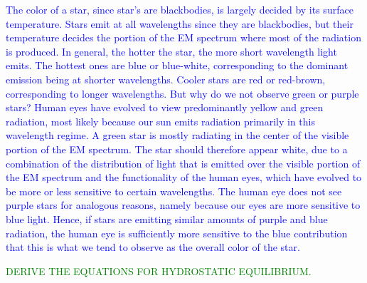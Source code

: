 \documentclass[main.tex]{subfiles}
\begin{document}
\begin{tcolorbox}[sharp corners, colback=blue!30, colframe=blue!80!blue, title=Why is a star observed to have a given color?$^{12}$]
\par \textcolor{blue} {%
The color of a star, since star's are blackbodies, is largely decided by its surface temperature. Stars emit at all wavelengths since they are blackbodies, but their temperature decides the portion of the EM spectrum where most of the radiation is produced.  In general, the hotter the star, the more short wavelength light emits. The hottest ones are blue or blue-white, corresponding to the dominant emission being at shorter wavelengths. Cooler stars are red or red-brown, corresponding to longer wavelengths. 
But why do we not observe green or purple stars?  Human eyes have evolved to view predominantly yellow and green radiation, most likely because our sun emits radiation primarily in this wavelength regime.  A green star is mostly radiating in the center of the visible portion of the EM spectrum. The star should therefore appear white, due to a combination of the distribution of light that is emitted over the visible portion of the EM spectrum and the functionality of the human eyes, which have evolved to be more or less sensitive to certain wavelengths.  The human eye does not see purple stars for analogous reasons, namely because our eyes are more sensitive to blue light.  Hence, if stars are emitting similar amounts of purple and blue radiation, the human eye is sufficiently more sensitive to the blue contribution that this is what we tend to observe as the overall color of the star.}
\end{tcolorbox}

\begin{tcolorbox}[sharp corners, colback=green!30, colframe=green!80!blue, title=Stefan-Boltzmann Law$^{13}$]
\par \textcolor{green} {DERIVE THE EQUATIONS FOR HYDROSTATIC EQUILIBRIUM.}
\end{tcolorbox}
\end{document}
